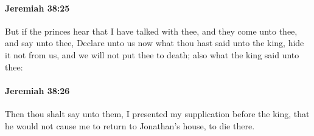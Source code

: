		\paragraph{Jeremiah 38:25} %
			\label{JEREMIAH-38-25}

			But if the princes hear that I have talked with thee, and they come unto thee, and say unto thee, Declare unto us now what thou hast said unto the king, hide it not from us, and we will not put thee to death; also what the king said unto thee:


		\paragraph{Jeremiah 38:26} %
			\label{JEREMIAH-38-26}

			Then thou shalt say unto them, I presented my supplication before the king, that he would not cause me to return to Jonathan’s house, to die there.

